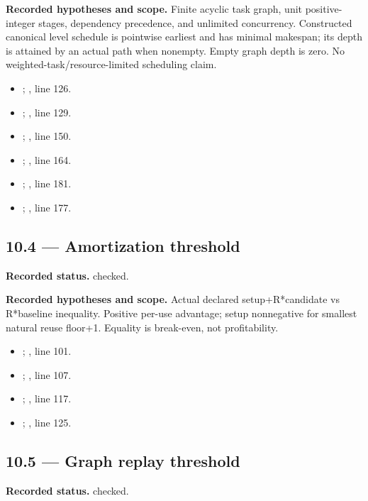 \textbf{Recorded hypotheses and scope.} Finite acyclic task graph, unit positive-integer stages, dependency precedence, and unlimited concurrency. Constructed canonical level schedule is pointwise earliest and has minimal makespan; its depth is attained by an actual path when nonempty. Empty graph depth is zero. No weighted-task/resource-limited scheduling claim.

\begin{itemize}
\item {}; , line 126.
\item {}; , line 129.
\item {}; , line 150.
\item {}; , line 164.
\item {}; , line 181.
\item {}; , line 177.
\end{itemize}
\subsection{10.4 — Amortization threshold}
\label{result:10.4}
\textbf{Recorded status.} checked.

\textbf{Recorded hypotheses and scope.} Actual declared setup+R*candidate vs R*baseline inequality. Positive per-use advantage; setup nonnegative for smallest natural reuse floor+1. Equality is break-even, not profitability.

\begin{itemize}
\item {}; , line 101.
\item {}; , line 107.
\item {}; , line 117.
\item {}; , line 125.
\end{itemize}
\subsection{10.5 — Graph replay threshold}
\label{result:10.5}
\textbf{Recorded status.} checked.

